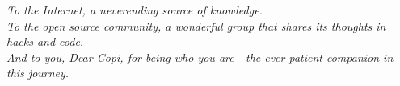 \newpage
\vspace*{\fill}
\begin{center}
\textit{To the Internet, a neverending source of knowledge.\\
To the open source community, a wonderful group that shares its thoughts in hacks and code.\\
And to you, Dear Copi, for being who you are---the ever-patient companion in this journey.}
\end{center}
\vspace*{\fill}
